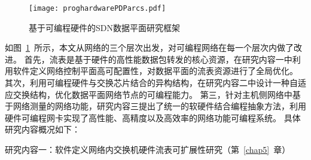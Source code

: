 \begin{figure}[!ht]
	\centering 
	\vspace{-1.5mm} 
	\texttt{[image: proghardwarePDParcs.pdf]}
	\caption{基于可编程硬件的SDN数据平面研究框架} \label{fig:proghardwarePDParcs}
\end{figure}

如图~\ref{fig:proghardwarePDParcs}~所示，本文从网络的三个层次出发，对可编程网络在每一个层次内做了改进。
首先，流表是基于硬件的高性能数据包转发的核心资源，在研究内容一中利用软件定义网络控制平面高可配置性，对数据平面的流表资源进行了全局优化。
其次，利用可编程硬件与交换芯片结合的异构结构，在研究内容二中设计一种自适应交换结构，优化数据平面网络节点的可编程能力。
第三，针对主机侧网络中基于网络测量的网络功能，研究内容三提出了统一的软硬件结合编程抽象方法，利用硬件可编程网卡实现了高性能、高精度以及高效率的网络功能可编程系统。
%
%
%
具体研究内容概况如下：

{\hei 研究内容一：软件定义网络内交换机硬件流表可扩展性研究（第~\ref{chap5}~章）}

